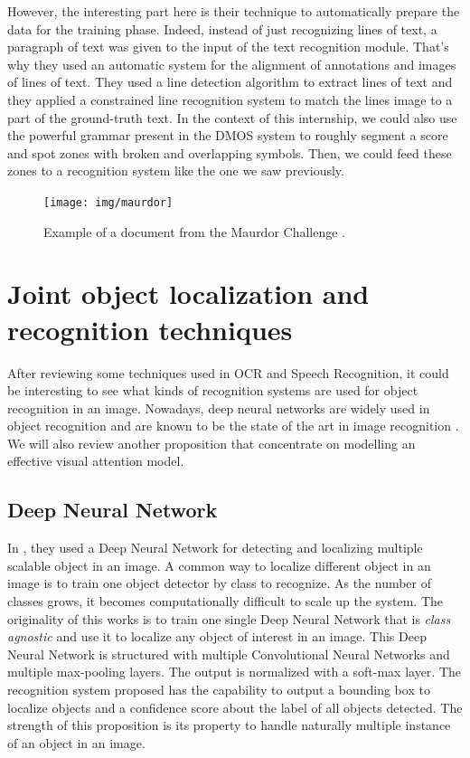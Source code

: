 \documentclass[11pt]{sdm}
\begin{document}
However, the interesting part here is their technique to automatically prepare the data for the training phase.
Indeed, instead of just recognizing lines of text, a paragraph of text was given to the input of the text recognition module.
That's why they used an automatic system for the alignment of annotations and images of lines of text.
They used a line detection algorithm to extract lines of text and they applied a constrained line recognition system to match the lines image to a part of the ground-truth text.
In the context of this internship, we could also use the powerful grammar present in the DMOS system to roughly segment a score and spot zones with broken and overlapping symbols.
Then, we could feed these zones to a recognition system like the one we saw previously.
\begin{figure}[btp]
  \centering
  \texttt{[image: img/maurdor]}
  \caption{\label{maurdor} Example of a document from the Maurdor Challenge \cite{moysset_a2ia_2014}. }
\end{figure}

\section{Joint object localization and recognition techniques} \label{sec:object}

After reviewing some techniques used in OCR and Speech Recognition, it could be interesting to see what kinds of recognition systems are used for object recognition in an image.
Nowadays, deep neural networks are widely used in object recognition and are known to be the state of the art in image recognition \cite{erhan_scalable_2014}.
We will also review another proposition \cite{ba_multiple_2014} that concentrate on modelling an effective visual attention model.

\subsection{Deep Neural Network}

In \cite{erhan_scalable_2014}, they used a Deep Neural Network for detecting and localizing multiple scalable object in an image.
A common way to localize different object in an image is to train one object detector by class to recognize.
As the number of classes grows, it becomes computationally difficult to scale up the system.
The originality of this works is to train one single Deep Neural Network that is \textit{class agnostic} and use it to localize any object of interest in an image.
This Deep Neural Network is structured with multiple Convolutional Neural Networks and multiple max-pooling layers.
The output is normalized with a soft-max layer.
The recognition system proposed has the capability to output a bounding box to localize objects and a confidence score about the label of all objects detected.
The strength of this proposition is its property to handle naturally multiple instance of an object in an image.
\end{document}
